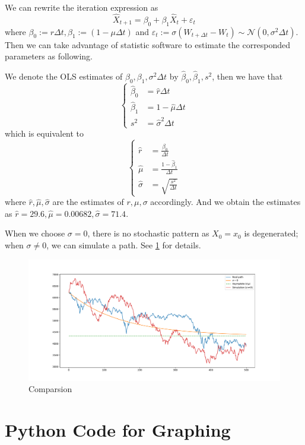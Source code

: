     We can rewrite the iteration expression as
    \[\hat X_{t+1}=
    \beta_0+\beta_1\hat X_t
    +\varepsilon_t\]
    where $\beta_0:=r\Delta t,\beta_1:=(1-\mu\Delta t)$
    and $\varepsilon_t:=\sigma(W_{t+\Delta t}-W_t)
    \sim\mathcal N(0,\sigma^2\Delta t)$.
    Then we can take advantage of statistic software to
    estimate the corresponded parameters as following.

    We denote the OLS estimates of $\beta_0,\beta_1,\sigma^2\Delta t$
    by $\hat\beta_0,\hat\beta_1,s^2$, then we have that
    \[\left\{\begin{aligned}
        \hat\beta_0&=\hat r\Delta t\\
        \hat\beta_1&=1-\hat\mu\Delta t\\
        s^2&=\hat\sigma^2\Delta t
    \end{aligned}\right.\]
    which is equivalent to
    \[\left\{\begin{aligned}
        \hat r&=\frac{\hat\beta_0}{\Delta t}\\
        \hat\mu&=\frac{1-\hat\beta_1}{\Delta t}\\
        \hat\sigma&=\sqrt{\frac{s^2}{\Delta t}}
    \end{aligned}\right.\]
    where $\hat r,\hat\mu,\hat\sigma$ are the estimates of $r,\mu,\sigma$
    accordingly.
    And we obtain the estimates as
    $\hat r=29.6,\hat\mu=0.00682,\hat\sigma=71.4$.

    When we choose $\sigma=0$, there is no stochastic pattern
    as $X_0=x_0$ is degenerated;
    when $\sigma\neq 0$, we can simulate a path.
    See \cref{fig:p5} for details.
    \begin{figure}[h]
        \centering
        \includegraphics[width=\textwidth]{figure}
        \caption{Comparsion}
        \label{fig:p5}
    \end{figure}

    \newpage
    \appendix
    \section{Python Code for Graphing}
    